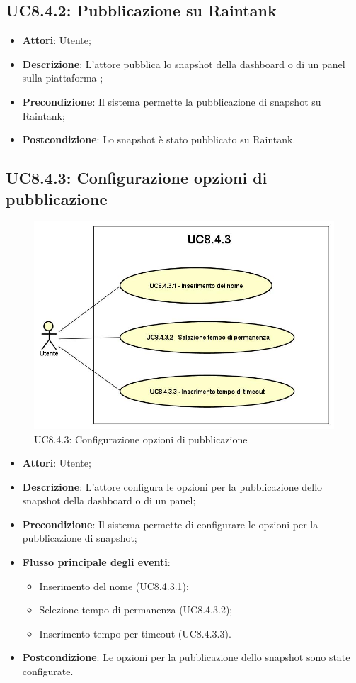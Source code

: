 \subsection{UC8.4.2: Pubblicazione su Raintank}
\begin{itemize}
	\item \textbf{Attori}: Utente;
	\item \textbf{Descrizione}: L'attore pubblica lo snapshot della dashboard o di un panel sulla piattaforma ;
	\item \textbf{Precondizione}: Il sistema permette la pubblicazione di snapshot su Raintank;
	\item \textbf{Postcondizione}: Lo snapshot è stato pubblicato su Raintank.
\end{itemize}

\subsection{UC8.4.3: Configurazione opzioni di pubblicazione}
\begin{figure} [H]
	\centering
	\includegraphics[scale=0.45]{Img/UC8-4-3}
	\caption{UC8.4.3: Configurazione opzioni di pubblicazione}\label{}
\end{figure}
\begin{itemize}
	\item \textbf{Attori}: Utente;
	\item \textbf{Descrizione}: L'attore configura le opzioni per la pubblicazione dello snapshot della dashboard o di un panel;
	\item \textbf{Precondizione}: Il sistema permette di configurare le opzioni per la pubblicazione di snapshot;
	\item \textbf{Flusso principale degli eventi}:
		\begin{itemize}
		\item Inserimento del nome (UC8.4.3.1);
		\item Selezione tempo di permanenza (UC8.4.3.2);
		\item Inserimento tempo per timeout (UC8.4.3.3).
	\end{itemize}
	\item \textbf{Postcondizione}: Le opzioni per la pubblicazione dello snapshot sono state configurate.
\end{itemize}


